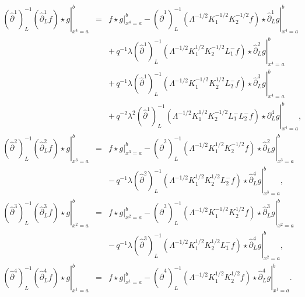 \documentclass[a4paper,11pt,oneside]{article}
\begin{document}
\begin{eqnarray}
\left. \left( \hat{\partial}^{1}\right) _{L}^{-1}\left( \hat{\partial}%
_{L}^{1}f\right) \star g\right| _{x^{4}=a}^{b} &=&\left. f\star g\right|
_{x^{4}=a}^{b}-\left. \left( \hat{\partial}^{1}\right)_L^{-1} \left( \Lambda
^{-1/2}K_{1}^{-1/2}K_{2}^{-1/2}f\right) \star \hat{\partial}_{L}^{1}g\right|
_{x^{4}=a}^{b} \\
&&+\,q^{-1}\lambda \left. \left( \hat{\partial}^{1}\right)
_{L}^{-1}\left( \Lambda ^{-1/2}K_{1}^{1/2}K_{2}^{-1/2}L_{1}^{-}f\right)
\star \hat{\partial}_{L}^{2}g\right| _{x^{4}=a}^{b}  \nonumber \\
&&+\,q^{-1}\lambda \left. \left( \hat{\partial}^{1}\right)
_{L}^{-1}\left( \Lambda ^{-1/2}K_{1}^{-1/2}K_{2}^{1/2}L_{2}^{-}f\right)
\star \hat{\partial}_{L}^{3}g\right| _{x^{4}=a}^{b}  \nonumber \\
&&+\,q^{-2}\lambda ^{2}\left. \left( \hat{\partial}^{1}\right)
_{L}^{-1}\left( \Lambda
^{-1/2}K_{1}^{1/2}K_{2}^{-1/2}L_{1}^{-}L_{2}^{-}f\right) \star \partial
_{L}^{4}g\right| _{x^{4}=a}^{b},  \nonumber \\
\left. \left( \hat{\partial}^{2}\right) _{L}^{-1}\left( \hat{\partial}%
_{L}^{2}f\right) \star g\right| _{x^{3}=a}^{b} &=&\left. f\star g\right|
_{x^{3}=a}^{b}-\left. \left( \hat{\partial}^{2}\right) _{L}^{-1}\left(
\Lambda ^{-1/2}K_{1}^{1/2}K_{2}^{-1/2}f\right) \star \hat{\partial}%
_{L}^{2}g\right| _{x^{3}=a}^{b}  \nonumber \\
&&-\,q^{-1}\lambda \left. \left( \hat{\partial}^{2}\right)
_{L}^{-1}\left( \Lambda ^{-1/2}K_{1}^{1/2}K_{2}^{1/2}L_{2}^{-}f\right) \star 
\hat{\partial}_{L}^{4}g\right| _{x^{3}=a}^{b},  \nonumber \\
\left. \left( \hat{\partial}^{3}\right) _{L}^{-1}\left( \hat{\partial}%
_{L}^{3}f\right) \star g\right| _{x^{2}=a}^{b} &=&\left. f\star g\right|
_{x^{2}=a}^{b}-\left. \left( \hat{\partial}^{3}\right) _{L}^{-1}\left(
\Lambda ^{-1/2}K_{1}^{-1/2}K_{2}^{1/2}f\right) \star \hat{\partial}%
_{L}^{3}g\right| _{x^{2}=a}^{b}  \nonumber \\
&&-\,q^{-1}\lambda \left. \left( \hat{\partial}^{3}\right)
_{L}^{-1}\left( \Lambda ^{-1/2}K_{1}^{1/2}K_{2}^{1/2}L_{1}^{-}f\right) \star 
\hat{\partial}_{L}^{4}g\right| _{x^{2}=a}^{b},  \nonumber \\
\left. \left( \hat{\partial}^{4}\right) _{L}^{-1}\left( \hat{\partial}%
_{L}^{4}f\right) \star g\right| _{x^{1}=a}^{b} &=&\left. f\star g\right|
_{x^{1}=a}^{b}-\left. \left( \hat{\partial}^{4}\right)_L^{-1} \left( \Lambda
^{-1/2}K_{1}^{1/2}K_{2}^{1/2}f\right) \star \hat{\partial}_{L}^{4}g\right|
_{x^{1}=a}^{b}.  \nonumber
\end{eqnarray}
\end{document}
